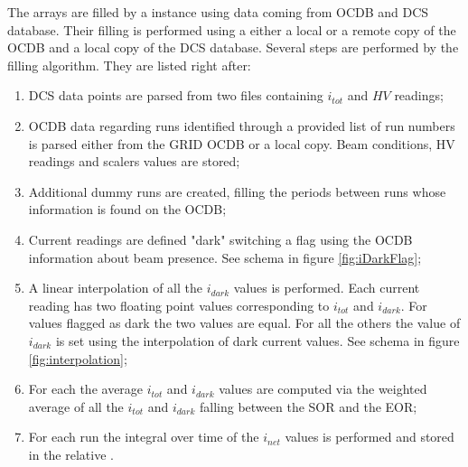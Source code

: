 The  arrays are filled by a  instance using data coming from OCDB and DCS database.
Their filling is performed using a either a local or a remote copy of the OCDB and a local copy of the DCS database.
Several steps are performed by the filling algorithm.
They are listed right after:
\begin{enumerate}
\item DCS data points are parsed from two files containing $i_{tot}$ and $HV$ readings;
\item OCDB data regarding runs identified through a provided list of run numbers is parsed either from the GRID OCDB or a local copy. Beam conditions, HV readings and scalers values are stored;
\item Additional dummy runs are created, filling the periods between runs whose information is found on the OCDB;
\item Current readings are defined "dark" switching a  flag using the OCDB information about beam presence. See schema in figure \ref{fig:iDarkFlag};
\item A linear interpolation of all the $i_{dark}$ values is performed. Each current reading has two floating point values corresponding to $i_{tot}$ and $i_{dark}$. For values flagged as dark the two values are equal. For all the others the value of $i_{dark}$ is set using the interpolation of dark current values. See schema in figure \ref{fig:interpolation};
\item For each  the average $i_{tot}$ and $i_{dark}$ values are computed via the weighted average of all the $i_{tot}$ and $i_{dark}$ falling between the SOR and the EOR;
\item For each run the integral over time of the $i_{net}$ values is performed and stored in the relative .
\end{enumerate}


